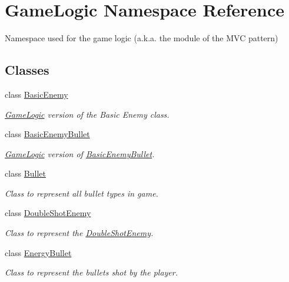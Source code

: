 \hypertarget{namespaceGameLogic}{}\section{Game\+Logic Namespace Reference}
\label{namespaceGameLogic}


Namespace used for the game logic (a.\+k.\+a. the module of the M\+VC pattern)  


\subsection*{Classes}
\begin{DoxyCompactItemize}
\item 
class \hyperlink{classGameLogic_1_1BasicEnemy}{Basic\+Enemy}
\begin{DoxyCompactList}\small\item\em \hyperlink{namespaceGameLogic}{Game\+Logic} version of the Basic Enemy class. \end{DoxyCompactList}\item 
class \hyperlink{classGameLogic_1_1BasicEnemyBullet}{Basic\+Enemy\+Bullet}
\begin{DoxyCompactList}\small\item\em \hyperlink{namespaceGameLogic}{Game\+Logic} version of \hyperlink{classGameLogic_1_1BasicEnemyBullet}{Basic\+Enemy\+Bullet}. \end{DoxyCompactList}\item 
class \hyperlink{classGameLogic_1_1Bullet}{Bullet}
\begin{DoxyCompactList}\small\item\em Class to represent all bullet types in game. \end{DoxyCompactList}\item 
class \hyperlink{classGameLogic_1_1DoubleShotEnemy}{Double\+Shot\+Enemy}
\begin{DoxyCompactList}\small\item\em Class to represent the \hyperlink{classGameLogic_1_1DoubleShotEnemy}{Double\+Shot\+Enemy}. \end{DoxyCompactList}\item 
class \hyperlink{classGameLogic_1_1EnergyBullet}{Energy\+Bullet}
\begin{DoxyCompactList}\small\item\em Class to represent the bullets shot by the player. \end{DoxyCompactList}\item 

\end{DoxyCompactItemize}
